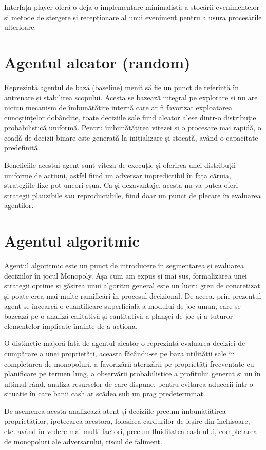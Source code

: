 Interfața player oferă o deja o implementare minimalistă a stocării evenimentelor și metode de ștergere și recepționare al unui eveniment pentru a ușura procesările ulterioare.

\section{Agentul aleator (random)}
Reprezintă agentul de bază (baseline) menit să fie un punct de referință în antrenare și stabilirea scopului. Acesta se bazează integral pe explorare și nu are niciun mecanism de îmbunătățire internă care ar fi favorizat exploatarea cunoștințelor dobândite, toate deciziile sale fiind aleator alese dintr-o distribuție probabilistică uniformă. Pentru îmbunătățirea vitezei și o procesare mai rapidă, o coadă de decizii binare este generată la inițializare și stocată, având o capacitate predefinită.

Beneficiile acestui agent sunt viteza de execuție și oferirea unei distribuții uniforme de acțiuni, astfel fiind un adversar impredictibil în fața căruia, strategiile fixe pot uneori eșua. Ca și dezavantaje, acesta nu va putea oferi strategii plauzibile sau reproductibile, fiind doar un punct de plecare în evaluarea agenților.

\section{Agentul algoritmic}
Agentul algoritmic este un punct de introducere în segmentarea și evaluarea deciziilor în jocul Monopoly. Așa cum am expus și mai sus, formalizarea unei strategii optime și găsirea unui algoritm general este un lucru greu de concretizat și poate crea mai multe ramificări în procesul decizional. De aceea, prin prezentul agent se încearcă o cuantificare superficială a modului de joc uman, care se bazează pe o analiză calitativă și cantitativă a planșei de joc și a tuturor elementelor implicate înainte de a acționa.

O distincție majoră față de agentul aleator o reprezintă evaluarea deciziei de cumpărare a unei proprietăți, aceasta făcându-se pe baza utilității sale în completarea de monopoluri, a favorizării aterizării pe proprietăți frecventate cu planificare pe termen lung, a observării probabilistice a profitului generat și nu în ultimul rând, analiza resurselor de care dispune, pentru evitarea aducerii într-o situație în care banii cash ar scădea sub un prag predeterminat.

De asemenea acesta analizează atent și deciziile precum îmbunătățirea proprietăților, ipotecarea acestora, folosirea cardurilor de ieșire din închisoare, etc. având în vedere mai mulți factori, precum fluiditatea cash-ului, completarea de monopoluri ale adversarului, riscul de faliment.

